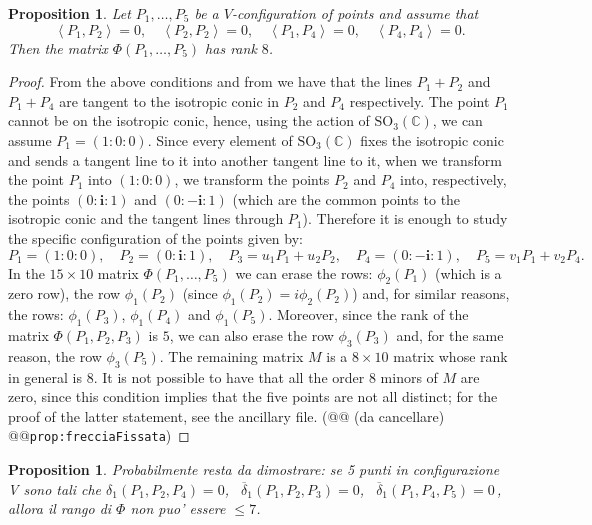 \documentclass[12pt, a4paper, reqno, captions=tableheading,bibliography=totoc]{scrartcl}
\theoremstyle{plain}
\newtheorem{prop}[lemma]{Proposition}
\theoremstyle{definition}
\newcommand{\scl}[2]{\left\langle {#1}, {#2} \right\rangle}
\newcommand{\iii}{\textbf{i}}
\begin{document}
\begin{prop}
\label{prop:frecciaFissata}
Let $P_1, \dots, P_5$ be a $V$-configuration of points and assume that
\[
\scl{P_1}{P_2}=0, \quad \scl{P_2}{P_2}=0, \quad \scl{P_1}{P_4}=0,
\quad \scl{P_4}{P_4}=0.
\]
Then the matrix $\Phi(P_1, \dots, P_5)$ has rank $8$.
\end{prop}
\begin{proof}
{From} the above conditions and from  we have that
the lines $P_1+P_2$ and $P_1+P_4$ are tangent to the isotropic
conic in $P_2$ and $P_4$ respectively. The point $P_1$ cannot be on
the isotropic conic, hence, using the
action of $\mathrm{SO}_3(\mathbb{C})$, we can assume $P_1 = (1: 0: 0)$.
Since every element of $\mathrm{SO}_3(\mathbb{C})$ fixes the
isotropic conic and sends a tangent line to it into another
tangent line to it, when we transform the point $P_1$
into $(1: 0: 0)$, we transform the points $P_2$ and $P_4$ into, respectively,
the points $(0: \iii: 1)$ and $(0: -\iii: 1)$ (which are the common points to
the isotropic conic and the tangent lines through $P_1$).
Therefore it is enough to study the
specific configuration of the points given by:
\[
P_1 = (1: 0: 0), \quad P_2=(0: \iii: 1), \quad P_3=u_1P_1+u_2P_2, \quad
P_4 = (0: -\iii: 1), \quad P_5 = v_1P_1+v_2P_4.
\]
In the $15\times 10$ matrix $\Phi(P_1, \dots, P_5)$ we can erase the
rows: $\phi_2(P_1)$ (which is a zero row), the row $\phi_1(P_2)$
(since $\phi_1(P_2)=i\phi_2(P_2)$) and, for similar reasons, the
rows: $\phi_1(P_3)$, $\phi_1(P_4)$ and $\phi_1(P_5)$.
Moreover, since the rank of the matrix $\Phi(P_1, P_2, P_3)$ is $5$,
we can also erase the row $\phi_3(P_3)$ and, for the same reason, the
row $\phi_3(P_5)$. The remaining matrix $M$ is a $8\times 10$ matrix whose rank
in general is $8$. It is not possible to have that all the order $8$ minors
of $M$ are zero, since this condition implies that the five points
are not all distinct; for the proof of the latter statement, see
the ancillary file. (@@ (da cancellare) @@\verb+prop:frecciaFissata+)
\end{proof}

\begin{prop}
\label{fantasma}
Probabilmente resta da dimostrare:
se 5 punti in configurazione V sono tali che
$\delta_1(P_1, P_2, P_4) = 0$, \ $\overline{\delta}_1(P_1, P_2, P_3) = 0$,
\ $\overline{\delta}_1(P_1, P_4, P_5) = 0$\,, allora il rango di $\Phi$
non puo' essere $\leq 7$.
\end{prop}
\end{document}
